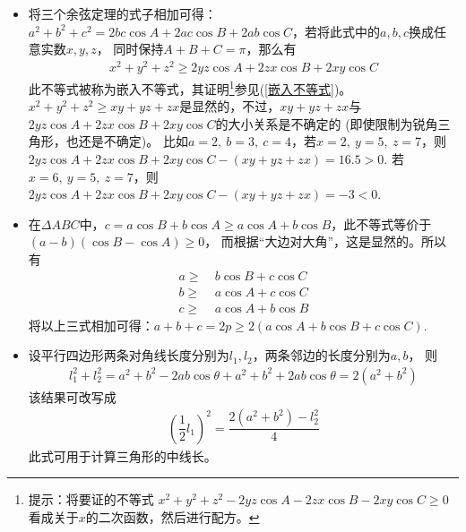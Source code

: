 \begin{itemize}[leftmargin=\inteval{\myitemleftmargin}pt,itemsep=
   \inteval{\myitemitempsep}pt,topsep=\inteval{\myitemtopsep}pt]
\item 将三个余弦定理的式子相加可得：$ a^2+b^2+c^2=2bc\cos A+2ac\cos B+
2ab\cos C $，若将此式中的$ a,b,c $换成任意实数$ x,y,z $，
同时保持$ A+B+C=\pi $，那么有
\begin{gather*}
    x^2+y^2+z^2\geq 2yz\cos A+2zx\cos B + 2xy\cos C
\end{gather*}
此不等式被称为嵌入不等式，其证明\footnote{提示：将要证的不等式
    $ x^2+y^2+z^2-2yz\cos A-2zx\cos B -2xy\cos C \geq 0 $
    看成关于$ x $的二次函数，然后进行配方。}参见(\ref{嵌入不等式})。
$ x^2+y^2+z^2\geq xy+yz+zx $是显然的，不过，$ xy+yz+zx $与
$ 2yz\cos A+2zx\cos B + 2xy\cos C $的大小关系是不确定的
(即使限制为锐角三角形，也还是不确定)。
比如$ a=2,\ b=3,\ c=4 $，若$ x=2,\ y=5,\ z=7 $，则
$ 2yz\cos A+2zx\cos B + 2xy\cos C-(xy+yz+zx)=16.5>0 $. 
若$ x=6,\ y=5,\ z=7 $，则
$ 2yz\cos A+2zx\cos B + 2xy\cos C-(xy+yz+zx)=-3<0 $. 

\item 在$ \Delta ABC $中，$ c=a\cos B+b\cos A\geq a\cos A+
b\cos B $，此不等式等价于\\ $ (a-b)(\cos B-\cos A)\geq 0 $，
而根据“大边对大角”，这是显然的。所以有
\begin{align*}
    a \geq &\ b\cos B+ c\cos C  \\
    b \geq &\ a\cos A+ c\cos C  \\
    c \geq &\ a\cos A+ b\cos B  	
\end{align*}
将以上三式相加可得：$ a+b+c=2p \geq 2(a\cos A+b\cos B+ c\cos C) $. 

\item 设平行四边形两条对角线长度分别为$ l_1,l_2 $，两条邻边的长度分别为$ a,b $，
则
\begin{gather*}
    l_1^2+l_2^2=a^2+b^2-2ab\cos\theta+a^2+b^2+2ab\cos\theta=2(a^2+b^2)
\end{gather*}
该结果可改写成
\begin{gather*}
    \left(\dfrac{1}{2}l_1\right)^2=\dfrac{2(a^2+b^2)-l_2^2}{4}
\end{gather*}
此式可用于计算三角形的中线长。 


\end{itemize}
